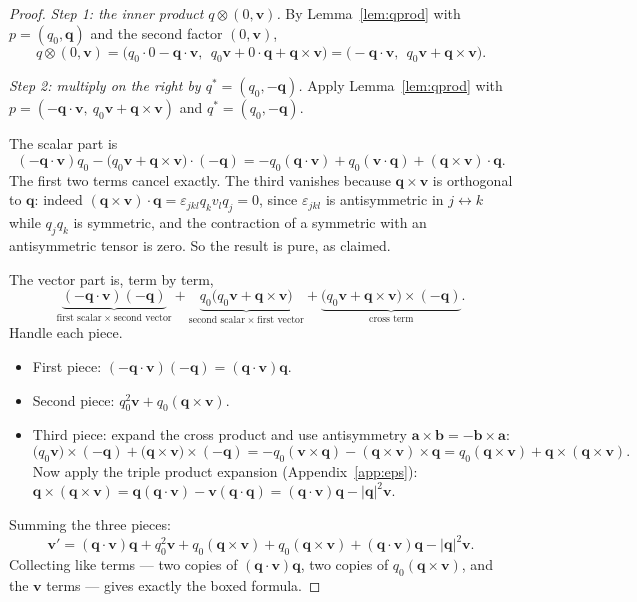 \documentclass[11pt]{article}
\newcommand{\vv}[1]{\bm{#1}}
\theoremstyle{plain}
\theoremstyle{definition}
\begin{document}
\begin{proof}
\emph{Step 1: the inner product $q\otimes(0,\vv v)$.} By Lemma~\ref{lem:qprod} with
$p=(q_0,\vv q)$ and the second factor $(0,\vv v)$,
\[
q\otimes(0,\vv v)=\big(q_0\cdot 0-\vv q\cdot\vv v,\ \ q_0\vv v+0\cdot\vv q+\vv q\times\vv v\big)
=\big(-\vv q\cdot\vv v,\ \ q_0\vv v+\vv q\times\vv v\big).
\]

\emph{Step 2: multiply on the right by $q^{*}=(q_0,-\vv q)$.} Apply Lemma~\ref{lem:qprod} with
$p=(-\vv q\cdot\vv v,\ q_0\vv v+\vv q\times\vv v)$ and $q^{*}=(q_0,-\vv q)$.

The scalar part is
\[
(-\vv q\cdot\vv v)q_0-\big(q_0\vv v+\vv q\times\vv v\big)\cdot(-\vv q)
=-q_0(\vv q\cdot\vv v)+q_0(\vv v\cdot\vv q)+(\vv q\times\vv v)\cdot\vv q .
\]
The first two terms cancel exactly. The third vanishes because $\vv q\times\vv v$ is orthogonal to
$\vv q$: indeed $(\vv q\times\vv v)\cdot\vv q=\varepsilon_{jkl}q_kv_lq_j=0$, since
$\varepsilon_{jkl}$ is antisymmetric in $j\leftrightarrow k$ while $q_jq_k$ is symmetric, and the
contraction of a symmetric with an antisymmetric tensor is zero. So the result is pure, as claimed.

The vector part is, term by term,
\[
\underbrace{(-\vv q\cdot\vv v)(-\vv q)}_{\text{first scalar}\ \times\ \text{second vector}}
+\underbrace{q_0\big(q_0\vv v+\vv q\times\vv v\big)}_{\text{second scalar}\ \times\ \text{first vector}}
+\underbrace{\big(q_0\vv v+\vv q\times\vv v\big)\times(-\vv q)}_{\text{cross term}} .
\]
Handle each piece.
\begin{itemize}[leftmargin=1.3em,topsep=2pt]
\item First piece: $(-\vv q\cdot\vv v)(-\vv q)=(\vv q\cdot\vv v)\vv q$.
\item Second piece: $q_0^2\vv v+q_0(\vv q\times\vv v)$.
\item Third piece: expand the cross product and use antisymmetry $\vv a\times\vv b=-\vv b\times\vv a$:
\[
\big(q_0\vv v\big)\times(-\vv q)+\big(\vv q\times\vv v\big)\times(-\vv q)
=-q_0(\vv v\times\vv q)-(\vv q\times\vv v)\times\vv q
=q_0(\vv q\times\vv v)+\vv q\times(\vv q\times\vv v).
\]
Now apply the triple product expansion (Appendix~\ref{app:eps}):
$\vv q\times(\vv q\times\vv v)=\vv q(\vv q\cdot\vv v)-\vv v(\vv q\cdot\vv q)
=(\vv q\cdot\vv v)\vv q-|\vv q|^2\vv v$.
\end{itemize}
Summing the three pieces:
\[
\vv v'=(\vv q\cdot\vv v)\vv q+q_0^2\vv v+q_0(\vv q\times\vv v)
+q_0(\vv q\times\vv v)+(\vv q\cdot\vv v)\vv q-|\vv q|^2\vv v .
\]
Collecting like terms --- two copies of $(\vv q\cdot\vv v)\vv q$, two copies of
$q_0(\vv q\times\vv v)$, and the $\vv v$ terms --- gives exactly the boxed formula.
\end{proof}
\end{document}
